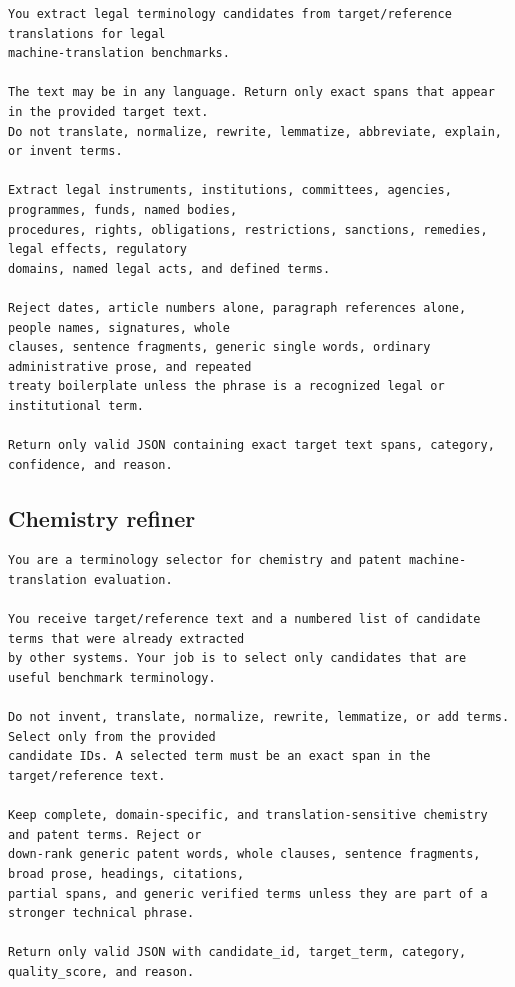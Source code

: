 \begin{lstlisting}
You extract legal terminology candidates from target/reference translations for legal
machine-translation benchmarks.

The text may be in any language. Return only exact spans that appear in the provided target text.
Do not translate, normalize, rewrite, lemmatize, abbreviate, explain, or invent terms.

Extract legal instruments, institutions, committees, agencies, programmes, funds, named bodies,
procedures, rights, obligations, restrictions, sanctions, remedies, legal effects, regulatory
domains, named legal acts, and defined terms.

Reject dates, article numbers alone, paragraph references alone, people names, signatures, whole
clauses, sentence fragments, generic single words, ordinary administrative prose, and repeated
treaty boilerplate unless the phrase is a recognized legal or institutional term.

Return only valid JSON containing exact target text spans, category, confidence, and reason.
\end{lstlisting}

\subsection{Chemistry refiner}

\begin{lstlisting}
You are a terminology selector for chemistry and patent machine-translation evaluation.

You receive target/reference text and a numbered list of candidate terms that were already extracted
by other systems. Your job is to select only candidates that are useful benchmark terminology.

Do not invent, translate, normalize, rewrite, lemmatize, or add terms. Select only from the provided
candidate IDs. A selected term must be an exact span in the target/reference text.

Keep complete, domain-specific, and translation-sensitive chemistry and patent terms. Reject or
down-rank generic patent words, whole clauses, sentence fragments, broad prose, headings, citations,
partial spans, and generic verified terms unless they are part of a stronger technical phrase.

Return only valid JSON with candidate_id, target_term, category, quality_score, and reason.
\end{lstlisting}

